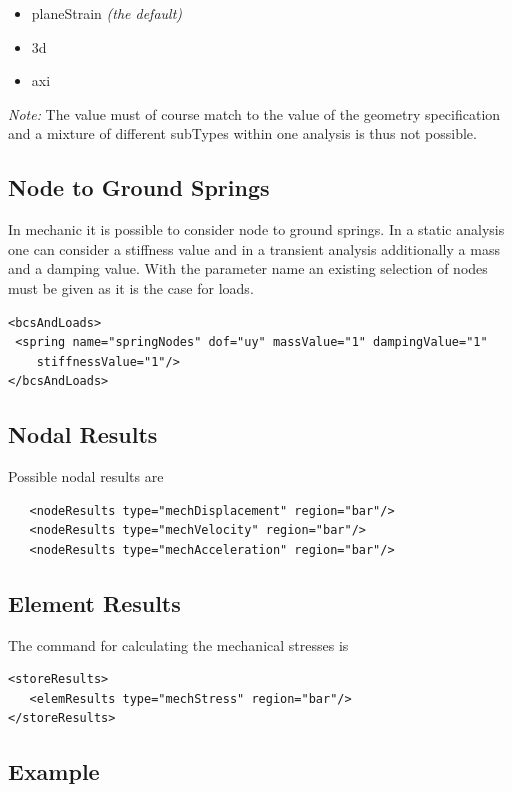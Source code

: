 \begin{itemize}
\item planeStrain \emph{(the default)}
\item 3d
\item axi
\end{itemize}

\emph{Note:} The  value must of course match to the 
value of the geometry specification and a mixture of different subTypes within
one analysis is thus not possible.

\subsection{Node to Ground Springs}
In mechanic it is possible to consider node to ground springs. In a
static analysis one can consider a stiffness value and
in a transient analysis additionally a mass and a damping value.
With the parameter name an existing selection of nodes must be given
as it is the case for loads.
\begin{verbatim}      
<bcsAndLoads>
 <spring name="springNodes" dof="uy" massValue="1" dampingValue="1" 
    stiffnessValue="1"/>
</bcsAndLoads>
\end{verbatim}

\subsection{Nodal Results}
Possible nodal results are

\begin{verbatim}
   <nodeResults type="mechDisplacement" region="bar"/>
   <nodeResults type="mechVelocity" region="bar"/>
   <nodeResults type="mechAcceleration" region="bar"/>
\end{verbatim}

\subsection{Element Results}
The command for calculating the mechanical stresses is
\begin{verbatim}      
<storeResults>
   <elemResults type="mechStress" region="bar"/>
</storeResults>
\end{verbatim}

\subsection{Example}

